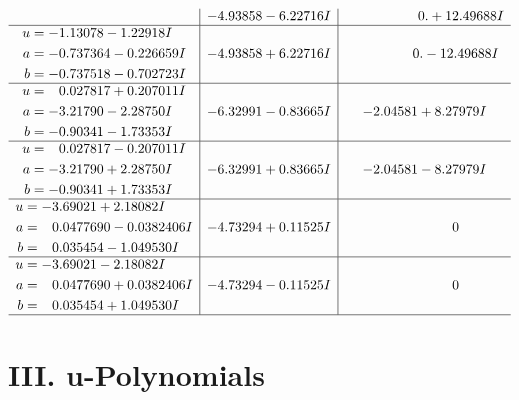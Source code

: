 \documentclass[1p]{elsarticle_modified}
\theoremstyle{definition}
\begin{document}
$$\begin{array}{c|c|c}
 & -4.93858 - 6.22716 I & \phantom{-0.000000 -}0. + 12.49688 I \\ \hline\begin{aligned}
u &= -1.13078 - 1.22918 I \\
a &= -0.737364 - 0.226659 I \\
b &= -0.737518 - 0.702723 I\end{aligned}
 & -4.93858 + 6.22716 I & \phantom{-0.000000 } 0. - 12.49688 I \\ \hline\begin{aligned}
u &= \phantom{-}0.027817 + 0.207011 I \\
a &= -3.21790 - 2.28750 I \\
b &= -0.90341 - 1.73353 I\end{aligned}
 & -6.32991 - 0.83665 I & -2.04581 + 8.27979 I \\ \hline\begin{aligned}
u &= \phantom{-}0.027817 - 0.207011 I \\
a &= -3.21790 + 2.28750 I \\
b &= -0.90341 + 1.73353 I\end{aligned}
 & -6.32991 + 0.83665 I & -2.04581 - 8.27979 I \\ \hline\begin{aligned}
u &= -3.69021 + 2.18082 I \\
a &= \phantom{-}0.0477690 - 0.0382406 I \\
b &= \phantom{-}0.035454 - 1.049530 I\end{aligned}
 & -4.73294 + 0.11525 I & \phantom{-0.000000 } 0 \\ \hline\begin{aligned}
u &= -3.69021 - 2.18082 I \\
a &= \phantom{-}0.0477690 + 0.0382406 I \\
b &= \phantom{-}0.035454 + 1.049530 I\end{aligned}
 & -4.73294 - 0.11525 I & \phantom{-0.000000 } 0\\
 \hline 
 \end{array}$$\newpage
\newpage\renewcommand{\arraystretch}{1}
\centering \section*{ III. u-Polynomials}
\end{document}
